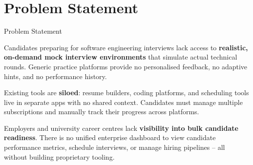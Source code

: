 \documentclass{beamer}
\begin{document}
\section{Problem Statement}
\begin{frame}{Problem Statement}

Candidates preparing for software engineering interviews lack access to \textbf{realistic, on-demand mock interview environments} that simulate actual technical rounds. Generic practice platforms provide no personalised feedback, no adaptive hints, and no performance history.

\vspace{8pt}

Existing tools are \textbf{siloed}: resume builders, coding platforms, and scheduling tools live in separate apps with no shared context. Candidates must manage multiple subscriptions and manually track their progress across platforms.

\vspace{8pt}

Employers and university career centres lack \textbf{visibility into bulk candidate readiness}. There is no unified enterprise dashboard to view candidate performance metrics, schedule interviews, or manage hiring pipelines -- all without building proprietary tooling.

\end{frame}

\end{document}
